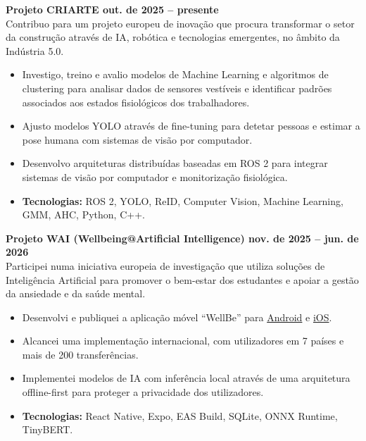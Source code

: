 \documentclass[10pt,a4paper]{article}
\begin{document}
\vspace{4pt}
\textbf{\color{accent}Projeto CRIARTE \textbar{} out. de 2025 -- presente}\\
Contribuo para um projeto europeu de inovação que procura transformar o setor da construção através de IA, robótica e tecnologias emergentes, no âmbito da Indústria 5.0.
\begin{itemize}
    \item Investigo, treino e avalio modelos de Machine Learning e algoritmos de clustering para analisar dados de sensores vestíveis e identificar padrões associados aos estados fisiológicos dos trabalhadores.
    \item Ajusto modelos YOLO através de fine-tuning para detetar pessoas e estimar a pose humana com sistemas de visão por computador.
    \item Desenvolvo arquiteturas distribuídas baseadas em ROS 2 para integrar sistemas de visão por computador e monitorização fisiológica.
    \item \textbf{Tecnologias:} ROS 2, YOLO, ReID, Computer Vision, Machine Learning, GMM, AHC, Python, C++.
\end{itemize}

\vspace{2pt}
\textbf{\color{accent}Projeto WAI (Wellbeing@Artificial Intelligence) \textbar{} nov. de 2025 -- jun. de 2026}\\
Participei numa iniciativa europeia de investigação que utiliza soluções de Inteligência Artificial para promover o bem-estar dos estudantes e apoiar a gestão da ansiedade e da saúde mental.
\begin{itemize}
    \item Desenvolvi e publiquei a aplicação móvel ``WellBe'' para \href{https://play.google.com/store/apps/details?id=com.caloale.waiv1\&hl=en_US}{Android} e \href{https://apps.apple.com/ie/app/wellbe-journaling-app/id6758772082}{iOS}.
    \item Alcancei uma implementação internacional, com utilizadores em 7 países e mais de 200 transferências.
    \item Implementei modelos de IA com inferência local através de uma arquitetura offline-first para proteger a privacidade dos utilizadores.
    \item \textbf{Tecnologias:} React Native, Expo, EAS Build, SQLite, ONNX Runtime, TinyBERT.
\end{itemize}
\end{document}
